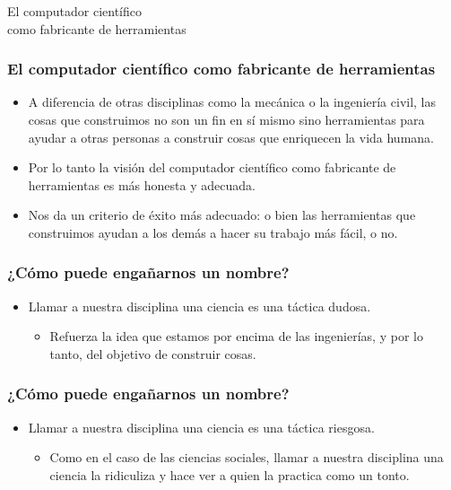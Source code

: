 \documentclass[spanish]{beamer}
\begin{document}
\begin{frame}
  \begin{center}
    \Huge{
      El computador científico \\
      como fabricante de herramientas
    }
  \end{center}
\end{frame}

\begin{frame}
  \frametitle{El computador científico como fabricante de herramientas}

  \begin{itemize}
    \item  A diferencia de otras disciplinas como la mecánica o la ingeniería
      civil, las cosas que construimos no son un fin en sí mismo sino
      herramientas para ayudar a otras personas a construir cosas que
      enriquecen la vida humana.

    \pause

    \item Por lo tanto la visión del computador científico como fabricante de
      herramientas es más honesta y adecuada.

    \pause

   \item Nos da un criterio de éxito más adecuado: o bien las herramientas que
     construimos ayudan a los demás a hacer su trabajo más fácil, o no.
  \end{itemize}
\end{frame}

\begin{frame}
  \frametitle{¿Cómo puede engañarnos un nombre?}

  \pause

  \begin{itemize}
    \item Llamar a nuestra disciplina una ciencia es una táctica dudosa.

    \pause

    \begin{itemize}
      \item Refuerza la idea que estamos por encima de las ingenierías, y por
        lo tanto, del objetivo de construir cosas.
    \end{itemize}
  \end{itemize}
\end{frame}

\begin{frame}
  \frametitle{¿Cómo puede engañarnos un nombre?}

  \begin{itemize}
    \item Llamar a nuestra disciplina una ciencia es una táctica riesgosa.

    \pause

    \begin{itemize}
      \item Como en el caso de las ciencias sociales, llamar a nuestra
        disciplina una ciencia la ridiculiza y hace ver a quien la practica
        como un tonto.
    \end{itemize}
  \end{itemize}
\end{frame}
\end{document}
